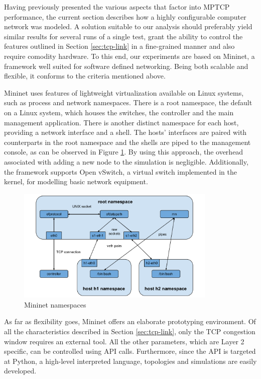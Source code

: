 
Having previously presented the various aspects that factor into MPTCP
performance, the current section describes how a highly configurable computer
network was modeled. A solution suitable to our analysis should preferably
yield similar results for several runs of a single test, grant the ability to
control the features outlined in Section \ref{sec:tcp-link} in a fine-grained manner
and also require comodity hardware. To this end, our experiments are based on
Mininet, a framework well suited for software defined networking. Being both
scalable and flexible, it conforms to the criteria mentioned above.

Mininet uses features of lightweight virtualization available on Linux
systems, such as process and network namespaces\cite{mininet}. There is a root
namespace, the default on a Linux system, which houses the switches, the
controller and the main management application. There is another distinct
namespace for each host, providing a network interface and a shell. The hosts'
interfaces are paired with counterparts in the root namespace and the shells
are piped to the management console, as can be observed in Figure
\ref{fig:mininet-design}. By using this approach, the overhead associated with
adding a new node to the simulation is negligible. Additionally, the framework
supports Open vSwitch, a virtual switch implemented in the kernel, for
modelling basic network equipment.

\begin{figure}
  \centering
  \includegraphics[width=0.85\textwidth]{img/mininet-design}
  \caption{Mininet namespaces}
  \label{fig:mininet-design}
\end{figure}

As far as flexibility goes, Mininet offers an elaborate prototyping
environment. Of all the characteristics described in Section \ref{sec:tcp-link},
only the TCP congestion window requires an external tool. All the other
parameters, which are Layer 2 specific, can be controlled using API calls.
Furthermore, since the API is targeted at Python, a high-level interpreted
language, topologies and simulations are easily developed.

